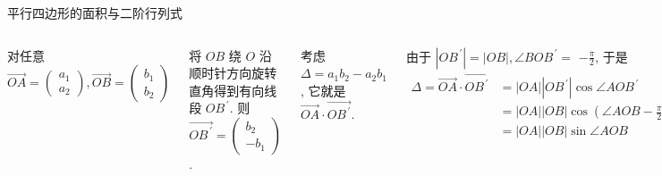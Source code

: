 \documentclass[10pt,punct]{ctexbeamer}
\begin{document}
\begin{frame}{平行四边形的面积与二阶行列式}

    \begin{columns}[c]
        \column{8cm}

        对任意 $\overrightarrow{O A}=\left(\begin{array}{l}a_1 \\ a_2\end{array}\right), \overrightarrow{O B}=\left(\begin{array}{l}b_1 \\ b_2\end{array}\right)$

        将 $O B$ 绕 $O$ 沿顺时针方向旋转直角得到有向线 段 $O B^{\, \prime}$. 则 $\overrightarrow{O B^{\, \prime}}=\left(\begin{array}{r}b_2 \\ -b_1\end{array}\right)$.



        考虑$\Delta=a_1 b_2-a_2 b_1$, 它就是 $\overrightarrow{O A} \cdot \overrightarrow{O B^{\, \prime}}$.

        由于 $\left|O B^{\, \prime}\right|=|O B|, \angle B O B^{\, \prime}=$ $-\frac{\pi}{2}$, 于是
        $$
        \begin{aligned}
            \Delta=\overrightarrow{O A} \cdot \overrightarrow{O B^{\, \prime}}
            & = |O A|\left|O B^{\, \prime}\right| \cos \angle A O B^{\, \prime}\\
            & = |O A||O B| \cos \left(\angle A O B-\frac{\pi}{2}\right) \\
            & = |O A||O B| \sin \angle A O B
        \end{aligned}
        $$


        \column{4.5cm}
        \begin{figure}[p]
            \includegraphics[scale=0.2]{det-2.jpeg}
        \end{figure}


\end{columns}
\end{frame}
\end{document}
